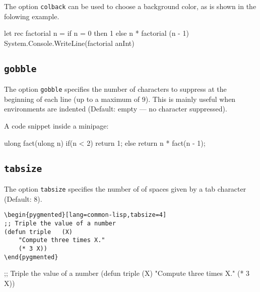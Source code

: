 \documentclass[10pt,a4paper]{article}
\begin{document}
The option \verb|colback| can be used to choose a background color, as
is shown in the folowing example.

\begin{Example}
\begin{pygmented}[lang=fsharp,colback=green!25]
let rec factorial n =
    if n = 0
    then 1
    else n * factorial (n - 1)
System.Console.WriteLine(factorial anInt)
\end{pygmented}
\end{Example}


\subsection{\texttt{gobble}}

The option \verb|gobble| specifies the number of characters to suppress
at the beginning of each line (up to a maximum of 9). This is mainly
useful when environments are indented (Default: empty — no character
suppressed).

\begin{Example}
A code snippet inside a minipage:
\begin{minipage}[t]{.5\linewidth}
    \begin{pygmented}[lang=d,gobble=8]
        ulong fact(ulong n)
        {
          if(n < 2)
            return 1;
          else
            return n * fact(n - 1);
        }
      \end{pygmented}
\end{minipage}
\end{Example}


\subsection{\texttt{tabsize}}

The option \verb|tabsize| specifies the number of of spaces given by a
tab character (Default: 8).

\begin{Verbatim}[showtabs,tabsize=1]
\begin{pygmented}[lang=common-lisp,tabsize=4]
;; Triple the value of a number
(defun triple	(X)
	"Compute three times X."
	(* 3 X))
\end{pygmented}
\end{Verbatim}

\begin{pygmented}[lang=common-lisp,tabsize=4]
;; Triple the value of a number
(defun triple	(X)
	"Compute three times X."
	(* 3 X))
\end{pygmented}
\end{document}
